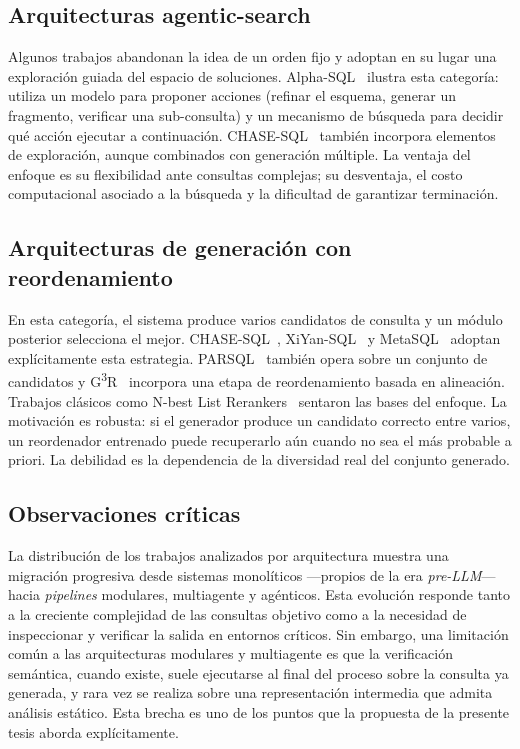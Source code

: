 \subsection{Arquitecturas agentic-search}
\label{subsec:sota-d2-agentic}

Algunos trabajos abandonan la idea de un orden fijo y adoptan en su lugar
una exploración guiada del espacio de soluciones.
Alpha-SQL~\cite{Alpha-SQL2025} ilustra esta categoría: utiliza un modelo
para proponer acciones (refinar el esquema, generar un fragmento, verificar
una sub-consulta) y un mecanismo de búsqueda para decidir qué acción
ejecutar a continuación. CHASE-SQL~\cite{CHASE-SQL2025} también incorpora
elementos de exploración, aunque combinados con generación múltiple. La
ventaja del enfoque es su flexibilidad ante consultas complejas; su
desventaja, el costo computacional asociado a la búsqueda y la dificultad
de garantizar terminación.

\subsection{Arquitecturas de generación con reordenamiento}
\label{subsec:sota-d2-rerank}

En esta categoría, el sistema produce varios candidatos de consulta y un
módulo posterior selecciona el mejor. CHASE-SQL~\cite{CHASE-SQL2025},
XiYan-SQL~\cite{XiYan-SQL2024} y MetaSQL~\cite{MetaSQL2024} adoptan
explícitamente esta estrategia. PARSQL~\cite{PARSQL2025} también opera
sobre un conjunto de candidatos y G\textsuperscript{3}R~\cite{G3R2023}
incorpora una etapa de reordenamiento basada en alineación. Trabajos
clásicos como N-best List Rerankers~\cite{N-bestListRerankers2022} sentaron
las bases del enfoque. La motivación es robusta: si el generador produce un
candidato correcto entre varios, un reordenador entrenado puede
recuperarlo aún cuando no sea el más probable a priori. La debilidad es la
dependencia de la diversidad real del conjunto generado.

\subsection{Observaciones críticas}
\label{subsec:sota-d2-obs}

La distribución de los trabajos analizados por arquitectura muestra una
migración progresiva desde sistemas monolíticos ---propios de la era
\emph{pre-LLM}--- hacia \emph{pipelines} modulares, multiagente y
agénticos. Esta evolución responde tanto a la creciente complejidad de las
consultas objetivo como a la necesidad de inspeccionar y verificar la
salida en entornos críticos. Sin embargo, una limitación común a las
arquitecturas modulares y multiagente es que la verificación semántica,
cuando existe, suele ejecutarse al final del proceso sobre la consulta ya
generada, y rara vez se realiza sobre una representación intermedia que
admita análisis estático. Esta brecha es uno de los puntos que la
propuesta de la presente tesis aborda explícitamente.

